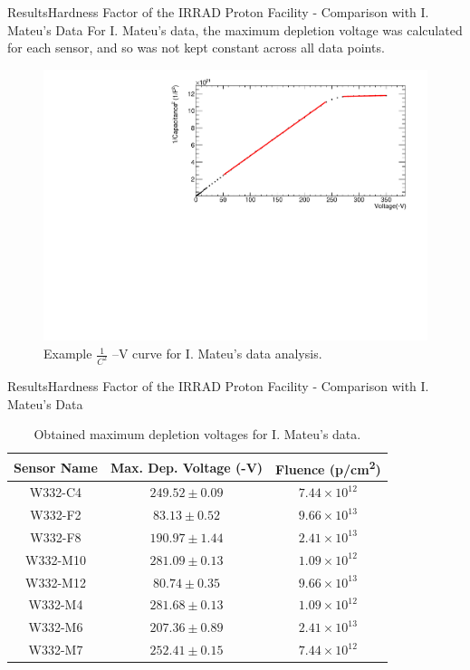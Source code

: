 \documentclass{beamer}
\begin{document}
    \begin{frame}{Results}{Hardness Factor of the IRRAD Proton Facility - Comparison with I. Mateu's Data}
    For I. Mateu's data, the maximum depletion voltage was calculated for each sensor, and so was not kept constant across all data points.
        \begin{figure}
            \centering
            \includegraphics[width = 0.9\linewidth]{IsidreCVexample.pdf}
            \caption{Example $\frac{1}{C^2}$ --V curve for I. Mateu's data analysis.}
        \end{figure}
    \end{frame}
    
    \begin{frame}{Results}{Hardness Factor of the IRRAD Proton Facility - Comparison with I. Mateu's Data}
    \begin{table}[htb]
        \centering
        \begin{tabular}{|c|c|c|}
            \hline
            Sensor Name & Max. Dep. Voltage (-V) & Fluence (p/cm\textsuperscript{2}) \\
            \hline
            W332-C4 & $249.52\pm 0.09$ & $7.44\times 10^{12}$\\
            W332-F2 & $83.13\pm 0.52$ & $9.66 \times 10^{13}$\\
            W332-F8 & $190.97\pm 1.44$ & $2.41\times 10^{13}$\\
            W332-M10 & $281.09\pm 0.13$ & $1.09\times 10^{12}$\\
            W332-M12 & $80.74\pm 0.35$ & $9.66\times 10^{13}$\\
            W332-M4 & $281.68\pm 0.13$ & $1.09\times 10^{12}$\\
            W332-M6 & $207.36\pm 0.89$ & $2.41\times 10^{13}$\\
            W332-M7 & $252.41\pm 0.15$ & $7.44\times 10^{12}$\\
            \hline
        \end{tabular}
        \caption{Obtained maximum depletion voltages for I. Mateu's data.}
    \end{table}
    \end{frame}
    
\end{document}
